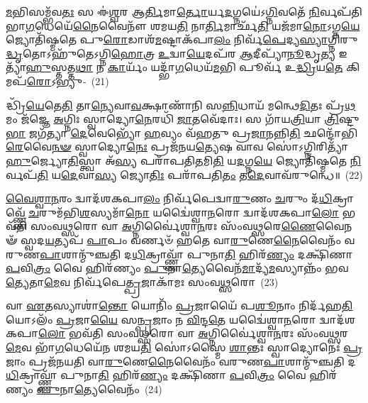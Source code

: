 \-\ul{𑌮}\-𑌭𑌿𑌸𑌮𑍍𑌭᳴𑌵\-\ul{𑌤𑌃} 𑌸 𑌈॑\-\ul{𑌶𑍍𑌵}\-𑌰 𑌆\-\ul{𑌰𑍍𑌤𑌿}\-𑌮𑌾\-\ul{𑌰𑍍𑌤𑍋}\-𑌰𑍍𑌯\-\ul{𑌦}\-𑌗𑍍𑌨𑌯𑍇॑\-𑌽\-\ul{𑌗𑍍𑌨𑌿}\-𑌵𑌤𑍇᳴ \ul{𑌨𑌿}\-𑌰𑍍𑌵𑌪᳴𑌤𑌿 𑌭𑌾\-\ul{𑌗}\-𑌧𑍇𑌯𑍇᳴\-\ul{𑌨𑍈}\-𑌵𑍈𑌨𑍗᳴ 𑌶𑌮𑌯\-\ul{𑌤𑌿} 𑌨𑌾\-\ul{𑌰𑍍𑌤𑌿}\-𑌮𑌾𑌰𑍍𑌛᳴\-\ul{𑌤𑌿} 𑌯𑌜᳴𑌮𑌾\-\ul{𑌨𑍋}\-\-𑌽𑌗𑍍𑌨\-\ul{𑌯𑍇} 𑌜𑍍𑌯𑍋𑌤𑌿᳴𑌷𑍍𑌮𑌤𑍇 𑌪𑍁\-\ul{𑌰𑍋}\-𑌡𑌾𑌶᳴\-\-\ul{𑌮}\-𑌷𑍍𑌟𑌾\-𑌕᳴𑌪𑌾\-\ul{𑌲𑌂} 𑌨𑌿𑌰𑍍𑌵᳴\-\ul{𑌪𑍇}\-𑌦𑍍𑌯\-\ul{𑌸𑍍𑌯𑌾}\-𑌗𑍍𑌨𑌿𑌰𑍁\-\ul{𑌦𑍍𑌧𑍃}\-𑌤𑍋\-𑌽𑌹𑍁᳴𑌤𑍇\-𑌽𑌗𑍍𑌨𑌿\-\ul{𑌹𑍋}\-𑌤𑍍𑌰 \ul{𑌉}\-𑌦𑍍𑌵𑌾\-\ul{𑌯𑍇}\-𑌦𑌪᳴𑌰 \ul{𑌆}\-𑌦𑍀𑌪𑍍𑌯𑌾᳴\-\ul{𑌨𑍂}\-𑌦𑍍𑌧𑍃\-\ul{𑌤𑍍𑌯} 𑌇𑌤𑍍𑌯𑌾᳴\-\ul{𑌹𑍁}\-𑌸𑍍𑌤𑌤𑍍𑌤\-\ul{𑌥𑌾} 𑌨 \ul{𑌕𑌾}\-𑌰𑍍𑌯𑌂᳴ 𑌯𑌦𑍍𑌭𑌾᳴\-\ul{𑌗}\-𑌧𑍇𑌯᳴\-\ul{𑌮}\-𑌭𑌿 𑌪𑍂𑌰𑍍𑌵᳴ 𑌉\-\ul{𑌦𑍍𑌧𑍍𑌰𑌿}\-𑌯\-\ul{𑌤𑍇} 𑌕𑌿𑌮𑌪᳴\-\ul{𑌰𑍋}\-\-𑌽𑌭𑍍𑌯𑍁-~(21)

𑌦𑍍𑌧𑍍𑌰𑌿᳴\-\ul{𑌯𑍇}\-𑌤𑍇\-\ul{𑌤𑌿} 𑌤𑌾\-\ul{𑌨𑍍𑌯𑍇}\-𑌵𑌾\-\ul{𑌵}\-𑌕𑍍𑌷𑌾𑌣𑌾᳴𑌨𑌿 𑌸\-\ul{𑌨𑍍𑌨𑌿}\-𑌧𑌾𑌯᳴ 𑌮𑌨𑍍𑌥𑍇\-\ul{𑌦𑌿}\-𑌤𑌃 𑌪𑍍𑌰᳴\-\ul{𑌥}\-𑌮𑌂 𑌜᳴𑌜𑍍𑌞𑍇 \ul{𑌅}\-𑌗𑍍𑌨𑌿𑌃 𑌸𑍍𑌵𑌾𑌦𑍍𑌯𑍋\-\ul{𑌨𑍇}\-𑌰𑌧𑌿᳴ \ul{𑌜𑌾}\-𑌤𑌵𑍇᳴𑌦𑌾𑌃। 𑌸 𑌗𑌾᳴𑌯\-\ul{𑌤𑍍𑌰𑌿}\-𑌯𑌾 \ul{𑌤𑍍𑌰𑌿}\-𑌷𑍍𑌟𑍁\-\ul{𑌭𑌾} 𑌜𑌗᳴𑌤𑍍𑌯𑌾 \ul{𑌦𑍇}\-𑌵𑍇𑌭𑍍𑌯𑍋᳴ \ul{𑌹}\-𑌵𑍍𑌯𑌂 𑌵᳴𑌹𑌤𑍁 𑌪𑍍𑌰\-\ul{𑌜𑌾}\-𑌨𑌨𑍍𑌨𑌿\-\ul{𑌤𑌿} 𑌛𑌨𑍍𑌦𑍋᳴𑌭𑌿\-\ul{𑌰𑍇}\-𑌵𑍈\-\ul{𑌨}\-\-\ul{𑍟} 𑌸𑍍𑌵𑌾𑌦𑍍𑌯𑍋\-\ul{𑌨𑍇𑌃} 𑌪𑍍𑌰𑌜᳴𑌨𑌯\-\ul{𑌤𑍍𑌯𑍇}\-𑌷 𑌵𑌾𑌵 𑌸𑍋॑\-𑌽𑌗𑍍𑌨𑌿𑌰𑌿𑌤𑍍𑌯𑌾᳴\-\ul{𑌹𑍁}\-𑌰𑍍𑌜𑍍𑌯𑍋\-\ul{𑌤𑌿}\-𑌸𑍍𑌤𑍍𑌵𑌾 𑌅᳴\-\ul{𑌸𑍍𑌯} 𑌪𑌰𑌾᳴𑌪𑌤𑌿\-\ul{𑌤}\-𑌮𑌿\-\ul{𑌤𑌿} 𑌯\-\ul{𑌦}\-𑌗𑍍𑌨\-\ul{𑌯𑍇} 𑌜𑍍𑌯𑍋𑌤𑌿᳴𑌷𑍍𑌮𑌤𑍇 \ul{𑌨𑌿}\-𑌰𑍍𑌵𑌪᳴\-\ul{𑌤𑌿} 𑌯\-\ul{𑌦𑍇}\-𑌵𑌾\-\ul{𑌸𑍍𑌯} 𑌜𑍍𑌯𑍋\-\ul{𑌤𑌿𑌃} 𑌪𑌰𑌾᳴𑌪𑌤𑌿\-\ul{𑌤𑌂} 𑌤\-\ul{𑌦𑍇}\-\-𑌵𑌾𑌵᳴\-𑌰𑍁𑌨𑍍𑌧𑍇॥~(22)

{\anuvakamend[{\-\ul{𑌕}\-\-\ul{𑌰𑍋}\-\-\ul{𑌤𑍍𑌯}\-\-\ul{𑌨𑍍𑌨𑌾}\-𑌦𑍋 𑌦᳴𑌧𑌾\-\ul{𑌤𑌿} 𑌯\-\ul{𑌦}\-𑌗𑍍𑌨\-\ul{𑌯𑍇} 𑌶𑍁𑌚᳴\-\ul{𑌯𑍇} 𑌚𑌕𑍍𑌷𑍁᳴\-\ul{𑌰𑍇}\-𑌵𑌾\-\ul{𑌸𑍍𑌮𑌿}\-𑌨𑍍𑌤𑍇𑌨᳴ 𑌦𑌧𑌾𑌤𑌿 𑌕𑌰𑍋\-\ul{𑌤𑌿} 𑌵𑌾\-\ul{𑌜𑌂} 𑌯𑌜᳴𑌮𑌾\-\ul{𑌨}\-𑌮𑍁\-\ul{𑌦𑍇}\-𑌵𑌾\-\ul{𑌸𑍍𑌯} 𑌷𑌟𑍍𑌚᳴}]}%

\-\ul{𑌵𑍈}\-\-\ul{𑌶𑍍𑌵𑌾}\-\-\ul{𑌨}\-𑌰𑌂 𑌦𑍍𑌵𑌾𑌦᳴𑌶\-𑌕𑌪𑌾\-\ul{𑌲𑌂} 𑌨𑌿𑌰𑍍𑌵᳴𑌪𑍇𑌦𑍍𑌵𑌾\-\ul{𑌰𑍁}\-𑌣𑌂 \ul{𑌚}\-𑌰𑍁𑌂 𑌦᳴\-\ul{𑌧𑌿}\-𑌕𑍍𑌰𑌾𑌵𑍍𑌣𑍍𑌣𑍇᳴ \ul{𑌚}\-𑌰𑍁𑌮᳴𑌭𑌿\-\ul{𑌶}\-𑌸𑍍𑌯𑌮𑌾᳴\-\ul{𑌨𑍋} 𑌯𑌦𑍍𑌵𑍈॑𑌶𑍍𑌵𑌾\-\ul{𑌨}\-𑌰𑍋 𑌦𑍍𑌵𑌾𑌦᳴𑌶\-𑌕𑌪𑌾\-\ul{𑌲𑍋} 𑌭𑌵᳴𑌤𑌿 𑌸𑌂𑌵\-\ul{𑌥𑍍𑌸}\-𑌰𑍋 𑌵𑌾 \ul{𑌅}\-𑌗𑍍𑌨𑌿𑌰𑍍𑌵𑍈॑𑌶𑍍𑌵𑌾\-\ul{𑌨}\-𑌰𑌃 𑌸𑌂᳴𑌵\-\ul{𑌥𑍍𑌸}\-𑌰𑍇\-\ul{𑌣𑍈}\-𑌵𑍈𑌨𑍟᳴ 𑌸𑍍𑌵𑌦\-\ul{𑌯}\-𑌤𑍍𑌯𑌪᳴ \ul{𑌪𑌾}\-𑌪𑌂 𑌵𑌰𑍍𑌣𑍞᳴ 𑌹𑌤𑍇 𑌵𑌾\-\ul{𑌰𑍁}\-𑌣𑍇\-\ul{𑌨𑍈}\-𑌵𑍈𑌨𑌂᳴ 𑌵𑌰𑍁𑌣\-\ul{𑌪𑌾}\-𑌶𑌾𑌨𑍍𑌮𑍁᳴𑌞𑍍𑌚𑌤𑌿 𑌦\-\ul{𑌧𑌿}\-𑌕𑍍𑌰𑌾𑌵𑍍𑌣𑍍𑌣𑌾᳴ 𑌪𑍁𑌨𑌾\-\ul{𑌤𑌿} 𑌹𑌿𑌰᳴\-\ul{𑌣𑍍𑌯𑌂} 𑌦𑌕𑍍𑌷𑌿᳴𑌣𑌾 \ul{𑌪}\-𑌵𑌿\-\ul{𑌤𑍍𑌰𑌂} 𑌵𑍈 𑌹𑌿𑌰᳴𑌣𑍍𑌯𑌂 \ul{𑌪𑍁}\-𑌨𑌾\-\ul{𑌤𑍍𑌯𑍇}\-𑌵𑍈𑌨᳴\-\ul{𑌮𑌾}\-𑌦𑍍𑌯᳴\-\ul{𑌮}\-𑌸𑍍𑌯𑌾𑌨𑍍𑌨𑌂᳴ 𑌭𑌵\-\ul{𑌤𑍍𑌯𑍇}\-𑌤𑌾\-\ul{𑌮𑍇}\-𑌵 𑌨𑌿𑌰𑍍𑌵᳴𑌪𑍇\-\ul{𑌤𑍍𑌪𑍍𑌰}\-𑌜𑌾𑌕𑌾᳴𑌮𑌃 𑌸𑌂𑌵\-\ul{𑌥𑍍𑌸}\-𑌰𑍋~(23)

𑌵𑌾 \ul{𑌏}\-𑌤𑌸𑍍𑌯𑌾𑌶𑌾॑\-\ul{𑌨𑍍𑌤𑍋} 𑌯𑍋𑌨𑌿𑌂᳴ \ul{𑌪𑍍𑌰}\-𑌜𑌾𑌯𑍈᳴ 𑌪\-\ul{𑌶𑍂}\-𑌨𑌾𑌂 𑌨𑌿𑌰𑍍𑌦᳴𑌹\-\ul{𑌤𑌿} 𑌯𑍋\-𑌽𑌲𑌂᳴ \ul{𑌪𑍍𑌰}\-𑌜𑌾\-\ul{𑌯𑍈} 𑌸\-\ul{𑌨𑍍𑌪𑍍𑌰}\-𑌜𑌾𑌂 𑌨 \ul{𑌵𑌿}\-𑌨𑍍𑌦\-\ul{𑌤𑍇} 𑌯𑌦𑍍𑌵𑍈॑𑌶𑍍𑌵𑌾\-\ul{𑌨}\-𑌰𑍋 𑌦𑍍𑌵𑌾𑌦᳴𑌶\-𑌕𑌪𑌾\-\ul{𑌲𑍋} 𑌭𑌵᳴𑌤𑌿 𑌸𑌂𑌵\-\ul{𑌥𑍍𑌸}\-𑌰𑍋 𑌵𑌾 \ul{𑌅}\-𑌗𑍍𑌨𑌿𑌰𑍍𑌵𑍈॑𑌶𑍍𑌵𑌾\-\ul{𑌨}\-𑌰𑌃 𑌸𑌂᳴𑌵\-\ul{𑌥𑍍𑌸}\-𑌰\-\ul{𑌮𑍇}\-𑌵 𑌭𑌾᳴\-\ul{𑌗}\-𑌧𑍇𑌯𑍇᳴𑌨 𑌶𑌮𑌯\-\ul{𑌤𑌿} 𑌸𑍋॑\-𑌽𑌸𑍍𑌮𑍈 \ul{𑌶𑌾}\-𑌨𑍍𑌤𑌃 𑌸𑍍𑌵𑌾𑌦𑍍𑌯𑍋𑌨𑍇𑌃॑ \ul{𑌪𑍍𑌰}\-𑌜𑌾𑌂 𑌪𑍍𑌰𑌜᳴𑌨𑌯𑌤𑌿 𑌵𑌾\-\ul{𑌰𑍁}\-𑌣𑍇\-\ul{𑌨𑍈}\-𑌵𑍈𑌨𑌂᳴ 𑌵𑌰𑍁𑌣\-\ul{𑌪𑌾}\-𑌶𑌾𑌨𑍍𑌮𑍁᳴𑌞𑍍𑌚𑌤𑌿 𑌦\-\ul{𑌧𑌿}\-𑌕𑍍𑌰𑌾𑌵𑍍𑌣𑍍𑌣𑌾᳴ 𑌪𑍁𑌨𑌾\-\ul{𑌤𑌿} 𑌹𑌿𑌰᳴\-\ul{𑌣𑍍𑌯𑌂} 𑌦𑌕𑍍𑌷𑌿᳴𑌣𑌾 \ul{𑌪}\-𑌵𑌿\-\ul{𑌤𑍍𑌰𑌂} 𑌵𑍈 𑌹𑌿𑌰᳴𑌣𑍍𑌯𑌂 \ul{𑌪𑍁}\-𑌨𑌾\-\ul{𑌤𑍍𑌯𑍇}\-𑌵𑍈𑌨𑌂᳴~(24)

